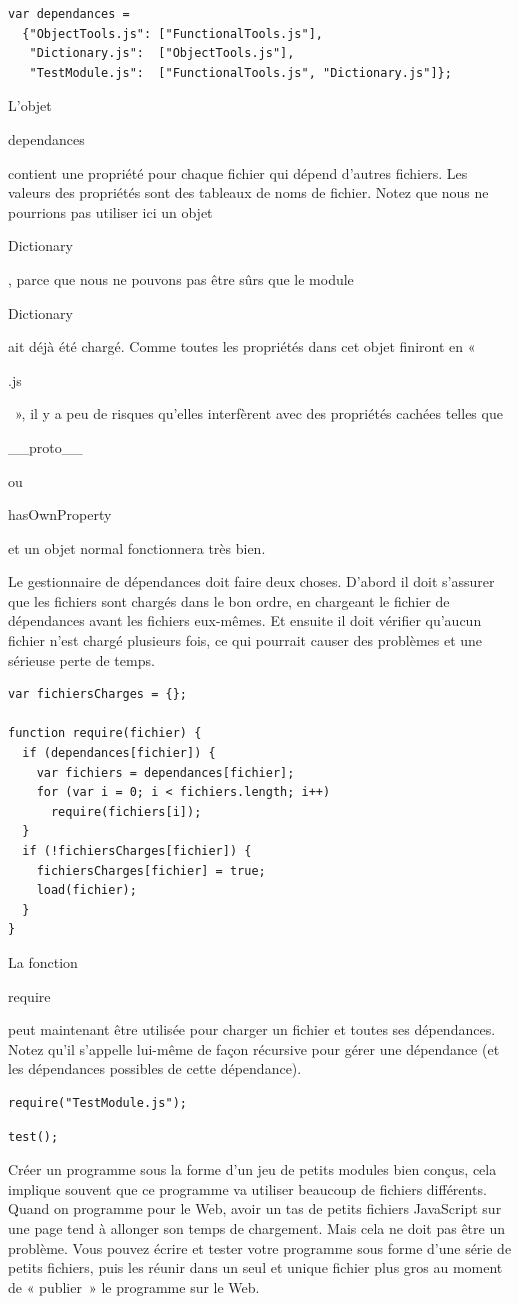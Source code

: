 \documentclass{FramateX}
\renewcommand{\texttt}[1]{\begin{sffamily}{#1}\end{sffamily}}
\begin{document}
\begin{lstlisting}
var dependances =
  {"ObjectTools.js": ["FunctionalTools.js"],
   "Dictionary.js":  ["ObjectTools.js"],
   "TestModule.js":  ["FunctionalTools.js", "Dictionary.js"]};
\end{lstlisting}
L'objet \texttt{dependances} contient une propriété pour chaque fichier
qui dépend d'autres fichiers. Les valeurs des propriétés sont des
tableaux de noms de fichier. Notez que nous ne pourrions pas utiliser
ici un objet \texttt{Dictionary}, parce que nous ne pouvons pas être
sûrs que le module \texttt{Dictionary} ait déjà été chargé. Comme toutes
les propriétés dans cet objet finiront en «~\texttt{.js}~», il y a peu
de risques qu'elles interfèrent avec des propriétés cachées telles que
\texttt{\_\_proto\_\_} ou \texttt{hasOwnProperty} et un objet normal
fonctionnera très bien.

Le gestionnaire de dépendances doit faire deux choses. D'abord il doit
s'assurer que les fichiers sont chargés dans le bon ordre, en chargeant
le fichier de dépendances avant les fichiers eux-mêmes. Et ensuite il
doit vérifier qu'aucun fichier n'est chargé plusieurs fois, ce qui
pourrait causer des problèmes et une sérieuse perte de temps.

\begin{lstlisting}
var fichiersCharges = {};

function require(fichier) {
  if (dependances[fichier]) {
    var fichiers = dependances[fichier];
    for (var i = 0; i < fichiers.length; i++)
      require(fichiers[i]);
  }
  if (!fichiersCharges[fichier]) {
    fichiersCharges[fichier] = true;
    load(fichier);
  }
}
\end{lstlisting}
La fonction \texttt{require} peut maintenant être utilisée pour charger
un fichier et toutes ses dépendances. Notez qu'il s'appelle lui-même de
façon récursive pour gérer une dépendance (et les dépendances possibles
de cette dépendance).

\begin{lstlisting}
require("TestModule.js");
\end{lstlisting}
\begin{lstlisting}
test();
\end{lstlisting}
\begin{center}\end{center}

Créer un programme sous la forme d'un jeu de petits modules bien conçus,
cela implique souvent que ce programme va utiliser beaucoup de fichiers
différents. Quand on programme pour le Web, avoir un tas de petits
fichiers JavaScript sur une page tend à allonger son temps de
chargement. Mais cela ne doit pas être un problème. Vous pouvez écrire
et tester votre programme sous forme d'une série de petits fichiers,
puis les réunir dans un seul et unique fichier plus gros au moment de «
publier~» le programme sur le Web.
\end{document}
